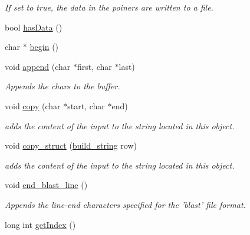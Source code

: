 \begin{DoxyCompactItemize}
\begin{DoxyCompactList}\small\item\em If set to true, the data in the poiners are written to a file. \end{DoxyCompactList}\item 
bool \hyperlink{classbuild__string_a52cafc5f26245fa4741566aabd6ddda0}{hasData} ()
\item 
char $\ast$ \hyperlink{classbuild__string_a37a1e89bb91897138559428e01fb35ac}{begin} ()
\item 
\hypertarget{classbuild__string_a17cb4ac597e6c69501066395dd91f75e}{
void \hyperlink{classbuild__string_a17cb4ac597e6c69501066395dd91f75e}{append} (char $\ast$first, char $\ast$last)}
\label{classbuild__string_a17cb4ac597e6c69501066395dd91f75e}

\begin{DoxyCompactList}\small\item\em Appends the chars to the buffer. \end{DoxyCompactList}\item 
void \hyperlink{classbuild__string_a34d1d576c008bf55a16f2d302f516f22}{copy} (char $\ast$start, char $\ast$end)
\begin{DoxyCompactList}\small\item\em adds the content of the input to the string located in this object. \end{DoxyCompactList}\item 
\hypertarget{classbuild__string_a6d482526f8327e8595137f0e9e7d687e}{
void \hyperlink{classbuild__string_a6d482526f8327e8595137f0e9e7d687e}{copy\_\-struct} (\hyperlink{classbuild__string}{build\_\-string} row)}
\label{classbuild__string_a6d482526f8327e8595137f0e9e7d687e}

\begin{DoxyCompactList}\small\item\em adds the content of the input to the string located in this object. \end{DoxyCompactList}\item 
\hypertarget{classbuild__string_a81409b0878da21f1086502e05a6ea05d}{
void \hyperlink{classbuild__string_a81409b0878da21f1086502e05a6ea05d}{end\_\-blast\_\-line} ()}
\label{classbuild__string_a81409b0878da21f1086502e05a6ea05d}

\begin{DoxyCompactList}\small\item\em Appends the line-\/end characters specified for the 'blast' file format. \end{DoxyCompactList}\item 
\hypertarget{classbuild__string_a992d7b129b663a9119e98b29ea4c8ad2}{
long int \hyperlink{classbuild__string_a992d7b129b663a9119e98b29ea4c8ad2}{getIndex} ()}
\label{classbuild__string_a992d7b129b663a9119e98b29ea4c8ad2}


\end{DoxyCompactItemize}
